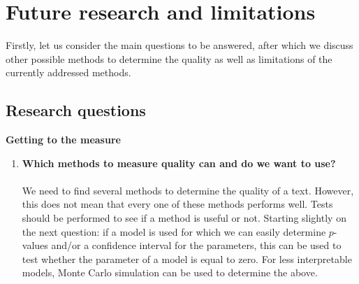 \documentclass{article}
\begin{document}
	\section{Future research and limitations}\label{sec:futureresearch}
	Firstly, let us consider the main questions to be answered, after which we discuss other possible methods to determine the quality as well as limitations of the currently addressed methods.
	
	\subsection{Research questions}
	\textbf{Getting to the measure}
	\begin{enumerate}
		\item \textbf{Which methods to measure quality can and do we want to use?}
		\\ \\
		We need to find several methods to determine the quality of a text. However, this does not mean that every one of these methods performs well. Tests should be performed to see if a method is useful or not. Starting slightly on the next question: if a model is used for which we can easily determine $p$-values and/or a confidence interval for the parameters, this can be used to test whether the parameter of a model is equal to zero. For less interpretable models, Monte Carlo simulation can be used to determine the above.
		

\end{enumerate}
\end{document}
